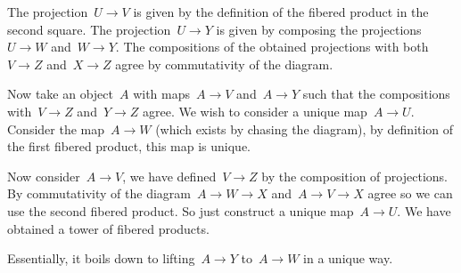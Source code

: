 \begin{exercise}
  The projection~$U\to V$ is given by the definition of the fibered product in the second square. The projection~$U\to Y$ is given by composing the projections~$U\to W$ and~$W\to Y$. The compositions of the obtained projections with both~$V\to Z$ and~$X\to Z$ agree by commutativity of the diagram.

  Now take an object~$A$ with maps~$A\to V$ and~$A\to Y$ such that the compositions with~$V\to Z$ and~$Y\to Z$ agree. We wish to consider a unique map~$A\to U$. Consider the map~$A\to W$ (which exists by chasing the diagram), by definition of the first fibered product, this map is unique.
  
  Now consider~$A\to V$, we have defined~$V\to Z$ by the composition of projections. By commutativity of the diagram~$A\to W\to X$ and~$A\to V\to X$ agree so we can use the second fibered product. So just construct a unique map~$A\to U$. We have obtained a tower of fibered products.

  Essentially, it boils down to lifting~$A\to Y$ to~$A\to W$ in a unique way.
\end{exercise}
